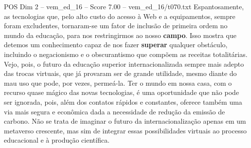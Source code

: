\begin{textsample}{POS Dim 2 – vem\_ed\_16 – Score 7.00 – vem\_ed\_16/t070.txt}
Espantosamente, as tecnologias que, pelo alto custo do acesso à Web e a equipamentos, sempre foram excludentes, tornaram-se um fator de inclusão de primeira ordem no mundo da educação, para nos restringirmos ao nosso \textbf{campo}.
Isso mostra que detemos um conhecimento capaz de nos fazer \textbf{superar} qualquer obstáculo, incluindo o negacionismo e o obscurantismo que compõem as receitas totalitárias.
Vejo, pois, o futuro da educação superior internacionalizada sempre mais adepto das trocas virtuais, que já provaram ser de grande utilidade, mesmo diante do mau uso que pode, por vezes, permeá-la.
Ter o mundo em nossa casa, com o recurso quase mágico das novas tecnologias, é uma oportunidade que não pode ser ignorada, pois, além dos contatos rápidos e constantes, oferece também uma via mais segura e econômica dada a necessidade de redução da emissão de carbono.
Não se trata de imaginar o futuro da internacionalização apenas em um metaverso crescente, mas sim de integrar essas possibilidades virtuais ao processo educacional e à produção científica.

\end{textsample}
